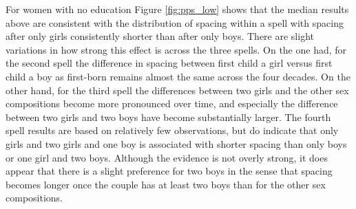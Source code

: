 \documentclass[12pt,letterpaper]{article}
\begin{document}
For women with no education Figure \ref{fig:pps_low} shows that the median results
above are consistent with the distribution of spacing within a spell with spacing 
after only girls consistently shorter than after only boys.
There are slight variations in how strong this effect is across the three spells.
On the one had, for the second spell the difference in spacing between first child a girl 
versus first child a boy as first-born remains almost the same across the four
decades.
On the other hand, for the third spell the differences between two girls and 
the other sex compositions become more pronounced over time, and especially
the difference between two girls and two boys have become substantially larger.
The fourth spell results are based on relatively few observations, but do indicate
that only girls and two girls and one boy is associated with shorter spacing than
only boys or one girl and two boys.
Although the evidence is not overly strong, it does appear that there is a slight
preference for two boys in the sense that spacing becomes longer once the couple
has at least two boys than for the other sex compositions.
\end{document}
